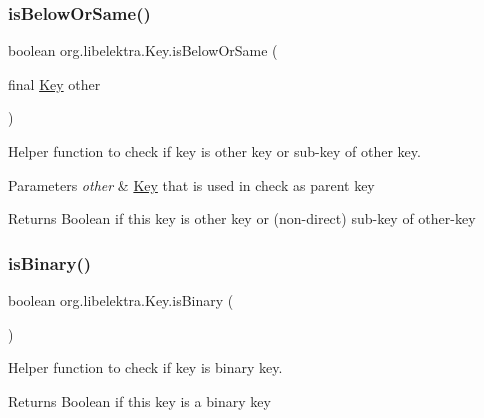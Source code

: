 \subsubsection{\texorpdfstring{is\+Below\+Or\+Same()}{isBelowOrSame()}}
{\footnotesize\ttfamily boolean org.\+libelektra.\+Key.\+is\+Below\+Or\+Same (\begin{DoxyParamCaption}\item[{final \hyperlink{classorg_1_1libelektra_1_1Key}{Key}}]{other }\end{DoxyParamCaption})\hspace{0.3cm}{\ttfamily [inline]}}



Helper function to check if key is other key or sub-\/key of other key. 


\begin{DoxyParams}{Parameters}
{\em other} & \hyperlink{classorg_1_1libelektra_1_1Key}{Key} that is used in check as parent key \\
\hline
\end{DoxyParams}
\begin{DoxyReturn}{Returns}
Boolean if this key is other key or (non-\/direct) sub-\/key of other-\/key 
\end{DoxyReturn}
\mbox{\label{classorg_1_1libelektra_1_1Key_a2323fd06287eac6343ed60756f3cc9c1}} 
\subsubsection{\texorpdfstring{is\+Binary()}{isBinary()}}
{\footnotesize\ttfamily boolean org.\+libelektra.\+Key.\+is\+Binary (\begin{DoxyParamCaption}{ }\end{DoxyParamCaption})\hspace{0.3cm}{\ttfamily [inline]}}



Helper function to check if key is binary key. 

\begin{DoxyReturn}{Returns}
Boolean if this key is a binary key 
\end{DoxyReturn}
\mbox{\label{classorg_1_1libelektra_1_1Key_a799b0577d5e1491702e45566c943bda4}} 
